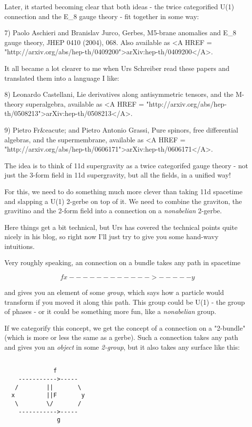 Later, it started becoming clear that both ideas - the twice 
categorified U(1) connection and the E_{8} gauge theory - fit 
together in some way:

7) Paolo Aschieri and Branislav Jurco, Gerbes, M5-brane 
anomalies and E_{8} gauge theory, JHEP 0410 (2004), 068.
Also available as <A HREF = "http://arxiv.org/abs/hep-th/0409200">arXiv:hep-th/0409200</A>.

It all became a lot clearer to me when Urs Schreiber read 
these papers and translated them into a language I like:

8) Leonardo Castellani, Lie derivatives along antisymmetric 
tensors, and the M-theory superalgebra, available as <A HREF = "http://arxiv.org/abs/hep-th/0508213">arXiv:hep-th/0508213</A>.

9) Pietro Fr&eacute; and Pietro Antonio Grassi, Pure spinors, 
free differential algebras, and the supermembrane, available
as <A HREF = "http://arxiv.org/abs/hep-th/0606171">arXiv:hep-th/0606171</A>.

The idea is to think of 11d supergravity as a twice categorifed
gauge theory - not just the 3-form field in 11d supergravity,
but all the fields, in a unified way!  

For this, we need to do something much more clever than taking
11d spacetime and slapping a U(1) 2-gerbe on top of it.  We 
need to combine the graviton, the gravitino and the 2-form field 
into a connection on a \emph{nonabelian} 2-gerbe.  

Here things get a bit technical, but Urs has covered the technical
points quite nicely in his blog, so right now I'll just try to
give you some hand-wavy intuitions.

Very roughly speaking, an connection on a bundle takes any path 
in spacetime


$$

             f
  x------------>-----y    
$$
    
and gives you an element of some \emph{group}, which says how a particle
would transform if you moved it along this path.  This group could
be U(1) - the group of phases - or it could be something more fun,
like a \emph{nonabelian} group.  

If we categorify this concept, we get the concept of a connection
on a "2-bundle" (which is more or less the same as a gerbe).  Such
a connection takes any path and gives you an \emph{object} in some 
\emph{2-group}, 
but it also takes any surface like this:


\begin{verbatim}

              f
    ----------->-----
   /        ||       \
  x         ||F       y  
   \        \/       /  
    ----------->-----
               g
\end{verbatim}
    
